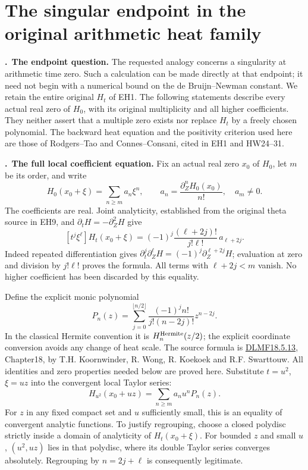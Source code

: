 \section{The singular endpoint in the original arithmetic heat family}
\label{sec:ep}
\newcommand{\EP}{\par\medskip\noindent\textbf{\theep.}\ }

\EP\textbf{The endpoint question.}
The requested analogy concerns a singularity at arithmetic time zero.
Such a calculation can be made directly at that endpoint; it need not
begin with a numerical bound on the de Bruijn--Newman constant.
We retain the entire original $H_t$ of EH1. The following statements
describe every actual real zero of $H_0$, with its original multiplicity
and all higher coefficients. They neither assert that a multiple zero
exists nor replace $H_t$ by a freely chosen polynomial.
The backward heat equation and the positivity criterion used here are
those of Rodgers--Tao and Connes--Consani, cited in EH1 and HW24--31.

\EP\textbf{The full local coefficient equation.}
Fix an actual real zero $x_0$ of $H_0$, let $m$ be its order, and write
\[
 H_0(x_0+\xi)=\sum_{n\ge m}a_n\xi^n,
 \qquad a_n=\frac{\partial_Z^nH_0(x_0)}{n!},\quad a_m\ne0.
 \tag{EP1}\label{ep:coefficients}
\]
The coefficients are real. Joint analyticity, established from the
original theta source in EH9, and $\partial_tH=-\partial_Z^2H$ give
\[
 [t^j\xi^\ell]H_t(x_0+\xi)
   =(-1)^j\frac{(\ell+2j)!}{j!\ell!}\,a_{\ell+2j}.
 \tag{EP2}\label{ep:heatcoeff}
\]
Indeed repeated differentiation gives
$\partial_t^j\partial_Z^\ell H=(-1)^j\partial_Z^{\ell+2j}H$;
evaluation at zero and division by $j!\ell!$ proves the formula.
All terms with $\ell+2j<m$ vanish. No higher coefficient has been
discarded by this equality.

Define the explicit monic polynomial
\[
 P_n(z)=\sum_{j=0}^{\lfloor n/2\rfloor}
          \frac{(-1)^jn!}{j!(n-2j)!}z^{n-2j}.
 \tag{EP3}\label{ep:hermite}
\]
In the classical Hermite convention it is $H_n^{\rm Hermite}(z/2)$;
the explicit coordinate conversion avoids any change of heat scale.
The source formula is \href{https://dlmf.nist.gov/18.5.E13}{DLMF18.5.13},
Chapter18, by T.H. Koornwinder, R. Wong, R. Koekoek and R.F. Swarttouw.
All identities and zero properties needed below are proved here.
Substitute $t=u^2$, $\xi=uz$ into the convergent local Taylor series:
\[
 H_{u^2}(x_0+uz)=\sum_{n\ge m}a_n u^nP_n(z).
 \tag{EP4}\label{ep:rescaled}
\]
For $z$ in any fixed compact set and $u$ sufficiently small, this is
an equality of convergent analytic functions. To justify regrouping,
choose a closed polydisc strictly inside a domain of analyticity of
$H_t(x_0+\xi)$. For bounded $z$ and small $u$, $(u^2,uz)$ lies in
that polydisc, where its double Taylor series converges absolutely.
Regrouping by $n=2j+\ell$ is consequently legitimate.


